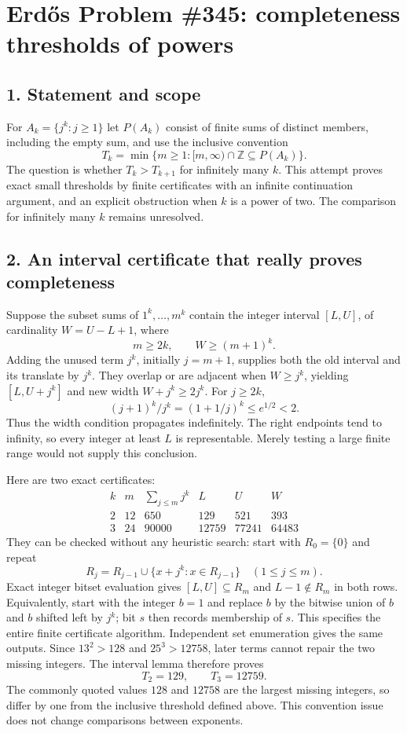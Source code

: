 \section*{Erd\H{o}s Problem \#345: completeness thresholds of powers}
\subsection*{1. Statement and scope}
For $A_k=\{j^k:j\ge1\}$ let $P(A_k)$ consist of finite sums of distinct
members, including the empty sum, and use the inclusive convention
\[
 T_k=\min\{m\ge1:[m,\infty)\cap\mathbb Z\subseteq P(A_k)\}.
\]
The question is whether $T_k>T_{k+1}$ for infinitely many $k$.
This attempt proves exact small thresholds by finite certificates with an
infinite continuation argument, and an explicit obstruction when $k$ is
a power of two. The comparison for infinitely many $k$ remains unresolved.

\subsection*{2. An interval certificate that really proves completeness}
Suppose the subset sums of $1^k,\ldots,m^k$ contain the integer interval
$[L,U]$, of cardinality $W=U-L+1$, where
\[
 m\ge2k,\qquad W\ge(m+1)^k.
\]
Adding the unused term $j^k$, initially $j=m+1$, supplies both the old
interval and its translate by $j^k$. They overlap or are adjacent when
$W\ge j^k$, yielding $[L,U+j^k]$ and new width $W+j^k\ge2j^k$.
For $j\ge2k$,
\[
 (j+1)^k/j^k=(1+1/j)^k\le e^{1/2}<2.
\]
Thus the width condition propagates indefinitely. The right endpoints
tend to infinity, so every integer at least $L$ is representable.
Merely testing a large finite range would not supply this conclusion.

Here are two exact certificates:
\[
\begin{array}{c|r|r|r|r|r}
 k&m&\sum_{j\le m}j^k&L&U&W\\ \hline
 2&12&650&129&521&393\\
 3&24&90000&12759&77241&64483
\end{array}
\]
They can be checked without any heuristic search: start with $R_0=\{0\}$
and repeat
\[
 R_j=R_{j-1}\cup\{x+j^k:x\in R_{j-1}\}\quad(1\le j\le m).
\]
Exact integer bitset evaluation gives $[L,U]\subseteq R_m$ and
$L-1\notin R_m$ in both rows. Equivalently, start with the integer $b=1$
and replace $b$ by the bitwise union of $b$ and $b$ shifted left by $j^k$;
bit $s$ then records membership of $s$. This specifies the entire finite
certificate algorithm. Independent set enumeration gives the same
outputs. Since $13^2>128$ and $25^3>12758$, later terms cannot repair
the two missing integers. The interval lemma therefore proves
\[
 \boxed{T_2=129,\qquad T_3=12759.}
\]
The commonly quoted values $128$ and $12758$ are the largest missing
integers, so differ by one from the inclusive threshold defined above.
This convention issue does not change comparisons between exponents.

